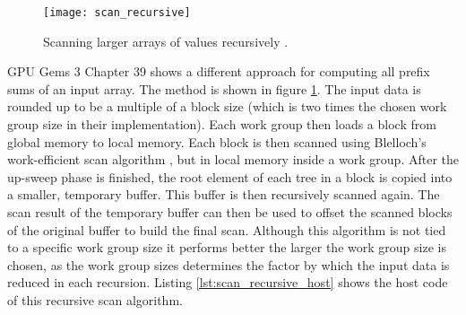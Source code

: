 \begin{figure}
\centering
\texttt{[image: scan\_recursive]}
\caption{Scanning larger arrays of values recursively \cite{gpu_gems_3_chapter_39}.}
\label{fig:scan_recursive}
\end{figure}

GPU Gems 3 Chapter 39 \cite{gpu_gems_3_chapter_39} shows a different approach for computing all prefix sums of an input array. The method is shown in figure \ref{fig:scan_recursive}. The input data is rounded up to be a multiple of a block size (which is two times the chosen work group size in their implementation). Each work group then loads a block from global memory to local memory. Each block is then scanned using Blelloch's work-efficient scan algorithm \cite{scan_blelloch}, but in local memory inside a work group. After the up-sweep phase is finished, the root element of each tree in a block is copied into a smaller, temporary buffer. This buffer is then recursively scanned again. The scan result of the temporary buffer can then be used to offset the scanned blocks of the original buffer to build the final scan.
Although this algorithm is not tied to a specific work group size it performs better the larger the work group size is chosen, as the work group sizes determines the factor by which the input data is reduced in each recursion.
Listing \ref{lst:scan_recursive_host} shows the host code of this recursive scan algorithm.



